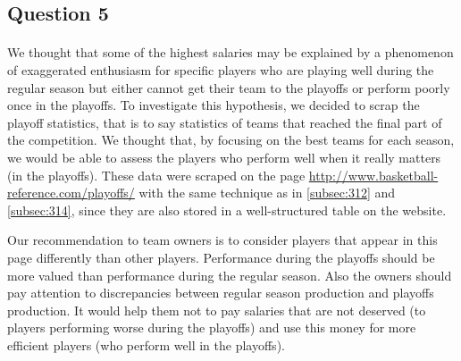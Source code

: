
\subsection{Question 5}
\label{subsec:315}
\paragraph{}We thought that some of the highest salaries may be explained by a phenomenon of exaggerated enthusiasm for specific players who are playing well during the regular season but either cannot get their team to the playoffs or perform poorly once in the playoffs. To investigate this hypothesis, we decided to scrap the playoff statistics, that is to say statistics of teams that reached the final part of the competition. We thought that, by focusing on the best teams for each season, we would be able to assess the players who perform well when it really matters (in the playoffs). These data were scraped on the page \url{http://www.basketball-reference.com/playoffs/} with the same technique as in \ref{subsec:312} and \ref{subsec:314}, since they are also stored in a well-structured table on the website. 

Our recommendation to team owners is to consider players that appear in this page differently than other players. Performance during the playoffs should be more valued than performance during the regular season. Also the owners should pay attention to discrepancies between regular season production and playoffs production. It would help them not to pay salaries that are not deserved (to players performing worse during the playoffs) and use this money for more efficient players (who perform well in the playoffs).